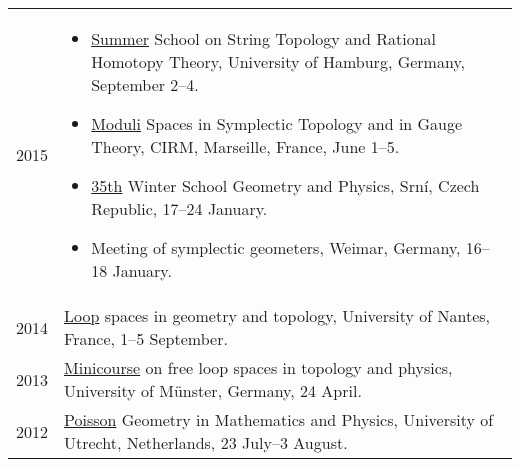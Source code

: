 \documentclass[a4paper,12pt]{article}
\begin{document}
\begin{tabularx}{\textwidth}{@{}lX@{}}
2015 & \begin{minipage}[t]{\minpagewidthCA} 
\begin{itemize}[leftmargin=*,itemsep=-1ex]
\item \href{http://grk1670.math.uni-hamburg.de/ratstr2015/}{Summer} School on String Topology and Rational Homotopy Theory, University of Hamburg, Germany, September 2--4.

\item \href{https://lalondeteleman.weebly.com/main-conference.html}{Moduli} Spaces in Symplectic Topology and in Gauge Theory, CIRM, Marseille, France, June 1--5.

\item \href{http://conference.math.muni.cz/srni/}{35th} Winter School Geometry and Physics, Srn\'i, Czech Republic, 17--24 January.

\item  Meeting of symplectic geometers, Weimar, Germany, 16--18 January.
\end{itemize}
\end{minipage}\\
 
2014 & \begin{minipage}[t]{\minpagewidthCA} 
\href{https://www.lebesgue.fr/content/sem2014-loops}{Loop} spaces in geometry and topology, University of Nantes, France,  1--5 September.
\end{minipage}\\

2013 & \begin{minipage}[t]{\minpagewidthCA} 
\href{https://www.uni-muenster.de/FB10/Service/show_article.shtml?id=4161\&brettid=8}{Minicourse} on free loop spaces in topology and physics, University of M\"unster, Germany, 24 April.
\end{minipage}\\

2012 & \begin{minipage}[t]{\minpagewidthCA}
\href{http://www.projects.science.uu.nl/poisson2012/Home.php}{Poisson} Geometry in Mathematics and Physics, University of Utrecht, Netherlands, 23 July--3 August.
\end{minipage}
\end{tabularx}
\endgroup
\end{document}
